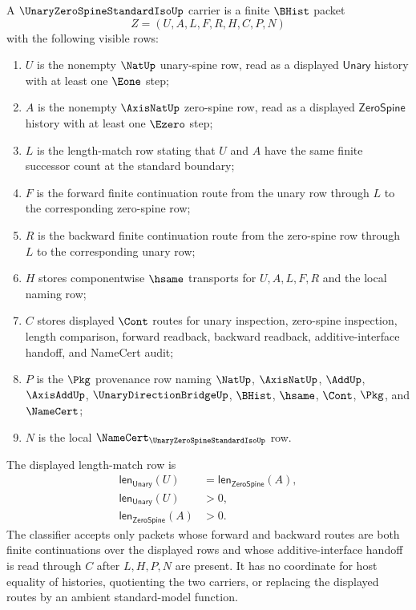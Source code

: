 \begin{definition}
\label{def:unary-zero-spine-standard-isomorphism-carrier}
A $\UnaryZeroSpineStandardIsoUp$ carrier is a finite $\BHist$ packet
$$
Z=(U,A,L,F,R,H,C,P,N)
$$
with the following visible rows:
\begin{enumerate}
\item $U$ is the nonempty $\NatUp$ unary-spine row, read as a displayed $\mathsf{Unary}$ history with at least one $\Eone$ step;
\item $A$ is the nonempty $\AxisNatUp$ zero-spine row, read as a displayed $\mathsf{ZeroSpine}$ history with at least one $\Ezero$ step;
\item $L$ is the length-match row stating that $U$ and $A$ have the same finite successor count at the standard boundary;
\item $F$ is the forward finite continuation route from the unary row through $L$ to the corresponding zero-spine row;
\item $R$ is the backward finite continuation route from the zero-spine row through $L$ to the corresponding unary row;
\item $H$ stores componentwise $\hsame$ transports for $U,A,L,F,R$ and the local naming row;
\item $C$ stores displayed $\Cont$ routes for unary inspection, zero-spine inspection, length comparison, forward readback, backward readback, additive-interface handoff, and NameCert audit;
\item $P$ is the $\Pkg$ provenance row naming $\NatUp$, $\AxisNatUp$, $\AddUp$, $\AxisAddUp$, $\UnaryDirectionBridgeUp$, $\BHist$, $\hsame$, $\Cont$, $\Pkg$, and $\NameCert$;
\item $N$ is the local $\NameCert_{\UnaryZeroSpineStandardIsoUp}$ row.
\end{enumerate}
The displayed length-match row is
$$
\begin{aligned}
\mathsf{len}_{\mathsf{Unary}}(U) &= \mathsf{len}_{\mathsf{ZeroSpine}}(A),\\
\mathsf{len}_{\mathsf{Unary}}(U) &> 0,\\
\mathsf{len}_{\mathsf{ZeroSpine}}(A) &> 0.
\end{aligned}
$$
The classifier accepts only packets whose forward and backward routes are both finite continuations over the displayed rows and whose additive-interface handoff is read through $C$ after $L,H,P,N$ are present. It has no coordinate for host equality of histories, quotienting the two carriers, or replacing the displayed routes by an ambient standard-model function.
\end{definition}

